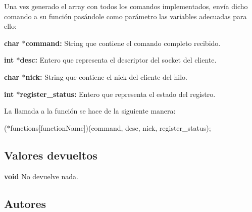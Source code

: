 Una vez generado el array con todos los comandos implementados, envía dicho comando a su función pasándole como parámetro las variables adecuadas para ello\+:


\begin{DoxyItemize}
\item {\bfseries char $\ast$command\+:} String que contiene el comando completo recibido. 
\item {\bfseries int $\ast$desc\+:} Entero que representa el descriptor del socket del cliente. 
\item {\bfseries char $\ast$nick\+:} String que contiene el nick del cliente del hilo. 
\item {\bfseries int $\ast$register\+\_\+status\+:} Entero que representa el estado del registro. 
\end{DoxyItemize}

La llamada a la función se hace de la siguiente manera\+:

{\ttfamily  ($\ast$functions\mbox{[}function\+Name\mbox{]})(command, desc, nick, register\+\_\+status); }\hypertarget{server_execute_function_return5}{}\subsection{Valores devueltos}\label{server_execute_function_return5}

\begin{DoxyItemize}
\item {\bfseries void} No devuelve nada. 
\end{DoxyItemize}\hypertarget{server_execute_function_authors5}{}\subsection{Autores}\label{server_execute_function_authors5}

